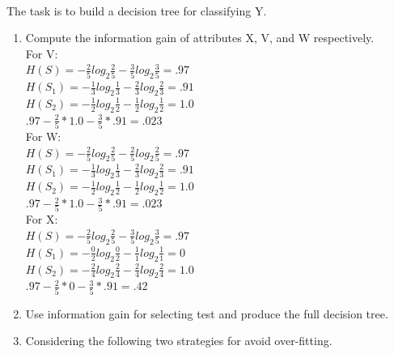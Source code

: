 \documentclass[12pt,letterpaper]{article}
\begin{document}
\begin{enumerate}
\begin{tabular}{c | c | c || c }
	\end{tabular} \\[15mm]
	The task is to build a decision tree for classifying Y. \\
	\begin{enumerate} 
		\item Compute the information gain of attributes X, V, and W respectively. \\
		For V: \\
		$H(S) = -\frac{2}{5}log_{2}\frac{2}{5} - \frac{3}{5}log_{2}\frac{3}{5} = .97$ \\
		$H(S_{1}) = -\frac{1}{3}log_{2}\frac{1}{3} - \frac{2}{3}log_{2}\frac{2}{3} = .91 $ \\
		$H(S_{2}) = -\frac{1}{2}log_{2}\frac{1}{2} - \frac{1}{2}log_{2}\frac{1}{2} = 1.0 $ \\
		$.97 - \frac{2}{5}*1.0 -\frac{3}{5}*.91 = .023$ \\
		For W: \\ 
		$H(S) = -\frac{2}{5}log_{2}\frac{2}{5} - \frac{2}{5}log_{2}\frac{2}{5} = .97$ \\
		$H(S_{1}) = -\frac{1}{3}log_{2}\frac{1}{3} - \frac{2}{3}log_{2}\frac{2}{3} = .91$ \\
		$H(S_{2}) = -\frac{1}{2}log_{2}\frac{1}{2} - \frac{1}{2}log_{2}\frac{1}{2} = 1.0$ \\
		$.97 - \frac{2}{5}*1.0 -\frac{3}{5}*.91 = .023$ \\
		For X: \\
		$H(S) = -\frac{2}{5}log_{2}\frac{2}{5} - \frac{3}{5}log_{2}\frac{3}{5} = .97$ \\
		$H(S_{1}) = -\frac{0}{2}log_{2}\frac{0}{2} - \frac{1}{1}log_{2}\frac{1}{1} = 0$ \\
		$H(S_{2}) = -\frac{2}{4}log_{2}\frac{2}{4} - \frac{2}{4}log_{2}\frac{2}{4} = 1.0$ \\
		$.97 - \frac{2}{5}*0 -\frac{3}{5}*.91 = .42$ \\
	
		\item Use information gain for selecting test and produce the full decision tree. \\
		
		\item Considering the following two strategies for avoid over-fitting. \\


\end{enumerate}
\end{enumerate}
\end{document}
